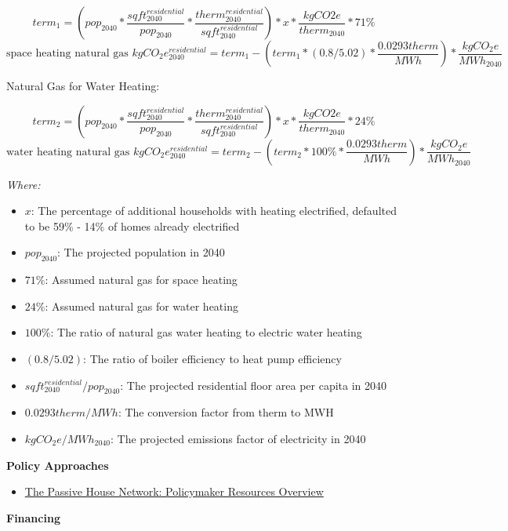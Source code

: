 \documentclass[
]{book}
\providecommand{\tightlist}{%
  \setlength{\itemsep}{0pt}\setlength{\parskip}{0pt}}
\begin{document}
\[term_1 = \left(pop_{2040} * \frac{sqft_{2040}^{residential}}{pop_{2040}} * \frac{therm_{2040}^{residential}}{sqft_{2040}^{residential}} \right) * x * \frac{kgCO2e}{therm_{2040}} * 71\% \]
\[\text{space heating natural gas }kgCO_2e_{2040}^{residential} = term_1 - \left(term_1 * (0.8/5.02) * \frac{0.0293therm}{MWh}\right) * \frac{kgCO_2e}{MWh_{2040}}\]

Natural Gas for Water Heating:

\[term_2 = \left(pop_{2040} * \frac{sqft_{2040}^{residential}}{pop_{2040}} * \frac{therm_{2040}^{residential}}{sqft_{2040}^{residential}} \right) * x * \frac{kgCO2e}{therm_{2040}} * 24\% \]
\[\text{water heating natural gas }kgCO_2e_{2040}^{residential} = term_2 - \left(term_2 * 100\% * \frac{0.0293therm}{MWh}\right) * \frac{kgCO_2e}{MWh_{2040}}\]

\emph{Where:}

\begin{itemize}
\tightlist
\item
  \(x\): The percentage of additional households with heating electrified, defaulted to be 59\% - 14\% of homes already electrified
\item
  \(pop_{2040}\): The projected population in 2040
\item
  \(71\%\): Assumed natural gas for space heating
\item
  \(24\%\): Assumed natural gas for water heating
\item
  \(100\%\): The ratio of natural gas water heating to electric water heating
\item
  \((0.8/5.02)\): The ratio of boiler efficiency to heat pump efficiency
\item
  \(sqft_{2040}^{residential}/pop_{2040}\): The projected residential floor area per capita in 2040
\item
  \(0.0293therm/MWh\): The conversion factor from therm to MWH
\item
  \(kgCO_2e/MWh_{2040}\): The projected emissions factor of electricity in 2040
\end{itemize}

\textbf{Policy Approaches}

\begin{itemize}
\tightlist
\item
  \href{https://naphnetwork.org/policymaker-resources/}{The Passive House Network: Policymaker Resources Overview}
\end{itemize}

\textbf{Financing}
\end{document}
